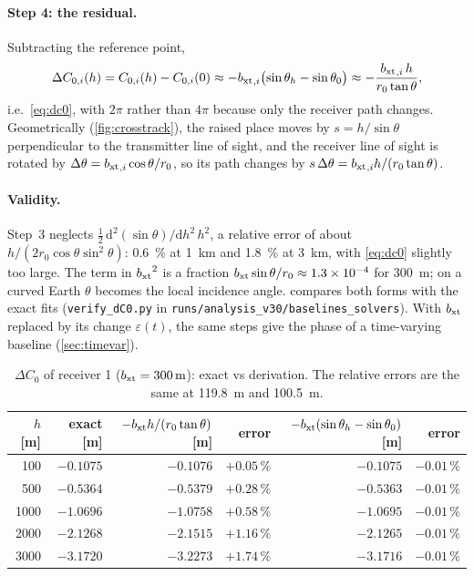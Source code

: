 \paragraph{Step 4: the residual.} Subtracting the reference point,
\begin{equation}
  \Delta C_{0,i}(h)=C_{0,i}(h)-C_{0,i}(0)\approx-{b_{\mathrm{xt}}}_{,i}\bigl(\sin\theta_h-\sin\theta_0\bigr)\approx-\frac{{b_{\mathrm{xt}}}_{,i}\,h}{r_0\tan\theta},
\end{equation}
i.e.\ \eqref{eq:dc0}, with $2\pi$ rather than $4\pi$ because only the receiver path changes. Geometrically
(\cref{fig:crosstrack}), the raised place moves by $s=h/\sin\theta$ perpendicular to the transmitter line of sight, and the
receiver line of sight is rotated by $\Delta\theta={b_{\mathrm{xt}}}_{,i}\cos\theta/r_0$, so its path changes by
$s\,\Delta\theta={b_{\mathrm{xt}}}_{,i}h/(r_0\tan\theta)$.

\paragraph{Validity.} Step~3 neglects
$\frac{1}{2}\,\mathrm d^2(\sin\theta)/\mathrm dh^2\,h^2$, a relative error of about $h/(2r_0\cos\theta\sin^2\theta)$:
\SI{0.6}{\percent} at \SI{1}{km} and \SI{1.8}{\percent} at \SI{3}{km}, with \eqref{eq:dc0} slightly too large. The term in
${b_{\mathrm{xt}}}^2$ is a fraction ${b_{\mathrm{xt}}}\sin\theta/r_0\approx\num{1.3e-4}$ for \SI{300}{m}; on a curved Earth $\theta$ becomes the
local incidence angle.  compares both forms with the exact fits (\texttt{verify\_dC0.py} in
\texttt{runs/\allowbreak analysis\_v30/\allowbreak baselines\_solvers}). With ${b_{\mathrm{xt}}}$ replaced by its change
$\varepsilon(t)$, the same steps give the phase of a time-varying baseline (\cref{sec:timevar}).

\begin{table}[htbp]
\centering
\caption[Check of the topographic residual]{$\Delta C_0$ of receiver 1 (${b_{\mathrm{xt}}}=\SI{300}{m}$): exact vs derivation. The
relative errors are the same at \SI{119.8}{m} and \SI{100.5}{m}.}
\label{tab:dc0check}
\small
\begin{tabular}{@{}r r r r r r@{}}
\toprule
$h$ [m] & exact [m] & $-{b_{\mathrm{xt}}} h/(r_0\tan\theta)$ [m] & error & $-{b_{\mathrm{xt}}}(\sin\theta_h-\sin\theta_0)$ [m] & error \\
\midrule
100  & $-0.1075$ & $-0.1076$ & $+0.05\,\%$ & $-0.1075$ & $-0.01\,\%$ \\
500  & $-0.5364$ & $-0.5379$ & $+0.28\,\%$ & $-0.5363$ & $-0.01\,\%$ \\
1000 & $-1.0696$ & $-1.0758$ & $+0.58\,\%$ & $-1.0695$ & $-0.01\,\%$ \\
2000 & $-2.1268$ & $-2.1515$ & $+1.16\,\%$ & $-2.1265$ & $-0.01\,\%$ \\
3000 & $-3.1720$ & $-3.2273$ & $+1.74\,\%$ & $-3.1716$ & $-0.01\,\%$ \\
\bottomrule
\end{tabular}
\end{table}

